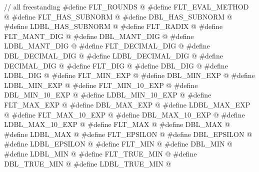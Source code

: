 %
%
%
%
%
%
%
%
%
%
%
%
%
%
%
%
%
%
%
%
%
%
%
%
%
%
%
%
%
%
%
%
%
%
%
%
%
%
%
%
%
\begin{codeblock}
// all freestanding
#define FLT_ROUNDS @\seebelow@
#define FLT_EVAL_METHOD @\seebelow@
#define FLT_HAS_SUBNORM @\seebelow@
#define DBL_HAS_SUBNORM @\seebelow@
#define LDBL_HAS_SUBNORM @\seebelow@
#define FLT_RADIX @\seebelow@
#define FLT_MANT_DIG @\seebelow@
#define DBL_MANT_DIG @\seebelow@
#define LDBL_MANT_DIG @\seebelow@
#define FLT_DECIMAL_DIG @\seebelow@
#define DBL_DECIMAL_DIG @\seebelow@
#define LDBL_DECIMAL_DIG @\seebelow@
#define DECIMAL_DIG @\seebelow@
#define FLT_DIG @\seebelow@
#define DBL_DIG @\seebelow@
#define LDBL_DIG @\seebelow@
#define FLT_MIN_EXP @\seebelow@
#define DBL_MIN_EXP @\seebelow@
#define LDBL_MIN_EXP @\seebelow@
#define FLT_MIN_10_EXP @\seebelow@
#define DBL_MIN_10_EXP @\seebelow@
#define LDBL_MIN_10_EXP @\seebelow@
#define FLT_MAX_EXP @\seebelow@
#define DBL_MAX_EXP @\seebelow@
#define LDBL_MAX_EXP @\seebelow@
#define FLT_MAX_10_EXP @\seebelow@
#define DBL_MAX_10_EXP @\seebelow@
#define LDBL_MAX_10_EXP @\seebelow@
#define FLT_MAX @\seebelow@
#define DBL_MAX @\seebelow@
#define LDBL_MAX @\seebelow@
#define FLT_EPSILON @\seebelow@
#define DBL_EPSILON @\seebelow@
#define LDBL_EPSILON @\seebelow@
#define FLT_MIN @\seebelow@
#define DBL_MIN @\seebelow@
#define LDBL_MIN @\seebelow@
#define FLT_TRUE_MIN @\seebelow@
#define DBL_TRUE_MIN @\seebelow@
#define LDBL_TRUE_MIN @\seebelow@
\end{codeblock}

